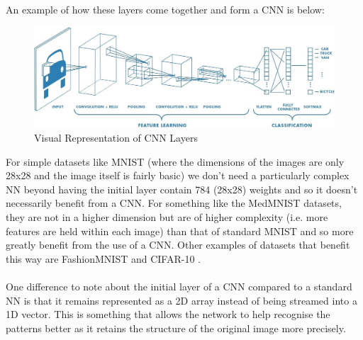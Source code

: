 An example of how these layers come together and form a CNN is below:
\begin{figure}[htbp]
	\centering
    \includegraphics[scale=0.3]{background/cnn_example.jpeg}
    \caption{Visual Representation of CNN Layers \cite{eli5_convnet}}
    \label{fig:cnn-layers}
\end{figure}

For simple datasets like MNIST (where the dimensions of the images are only 28x28 and the image itself is fairly basic) we don't need a particularly complex NN beyond having the initial layer contain 784 (28x28) weights and so it doesn't necessarily benefit from a CNN. 
For something like the MedMNIST \cite{medmnist} datasets, they are not in a higher dimension but are of higher complexity (i.e. more features are held within each image) than that of standard MNIST and so more greatly benefit from the use of a CNN. 
Other examples of datasets that benefit this way are FashionMNIST \cite{fashion} and CIFAR-10 \cite{cifar}.
\\ \\
One difference to note about the initial layer of a CNN compared to a standard NN is that it remains represented as a 2D array instead of being streamed into a 1D vector. 
This is something that allows the network to help recognise the patterns better as it retains the structure of the original image more precisely.
